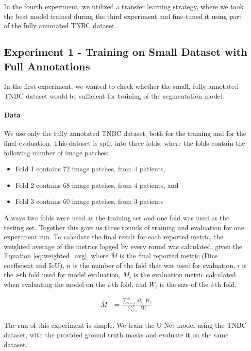 In the fourth experiment, we utilized a transfer learning strategy, where we took the best model trained during the third experiment and fine-tuned it using part of the fully annotated TNBC dataset.

\subsection{Experiment 1 - Training on Small Dataset with Full Annotations}
\label{sub:exp-1}
In the first experiment, we wanted to check whether the small, fully annotated TNBC dataset would be sufficient for training of the segmentation model.

\paragraph{Data}
We use only the fully annotated TNBC dataset, both for the training and for the final evaluation. This dataset is split into three folds, where the folds contain the following number of image patches:

\begin{itemize}
    \item Fold 1 contains 72 image patches, from 4 patients,
    \item Fold 2 contains 68 image patches, from 4 patients, and
    \item Fold 3 contains 60 image patches, from 3 patients
\end{itemize}

Always two folds were used as the training set and one fold was used as the testing set. Together this gave us three rounds of training and evaluation for one experiment run. To calculate the final result for each reported metric, the weighted average of the metrics logged by every round was calculated, given the Equation \ref{eq:weighted_avg}, where $\bar{M}$ is the final reported metric (Dice coefficient and IoU), $n$ is the number of the fold that was used for evaluation, $i$ is the \textit{i}-th fold used for model evaluation, $M_i$ is the evaluation metric calculated when evaluating the model on the \textit{i}-th fold, and $W_i$ is the size of the \textit{i}-th fold.

\begin{align}
\label{eq:weighted_avg}
\bar{M} &= \frac{\sum_{i=1}^{n} M_i \cdot W_i}{\sum_{i=1}^{n} W_i}
\end{align}

The run of this experiment is simple. We train the U-Net model using the TNBC dataset, with the provided ground truth masks and evaluate it on the same dataset.

